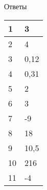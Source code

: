 \documentclass[twocolumn]{article}
\begin{document}
\newpage
 Ответы

\begin{table}[h]\begin{tabular}{|l|l|}
\hline
1 & 3
\\
\hline
2 & 4
\\
\hline
3 & 0,12
\\
\hline
4 & 0,31
\\
\hline
5 & 2
\\
\hline
6 & 3
\\
\hline
7 & -9
\\
\hline
8 & 18
\\
\hline
9 & 10,5
\\
\hline
10 & 216
\\
\hline
11 & -4
\\
\hline
\end{tabular}\end{table}



\newpage
\end{document}
